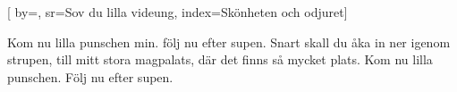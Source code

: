 

[ 		%
	by={},					%
	sr={Sov du lilla videung},					%
	index={Skönheten och odjuret}]						%
	

\beginverse*						%
Kom nu lilla punschen min.
följ nu efter supen. 
Snart skall du åka in
ner igenom strupen,
till mitt stora magpalats,
där det finns så mycket plats.
Kom nu lilla punschen.
Följ nu efter supen.
\endverse							%

\endsong							%